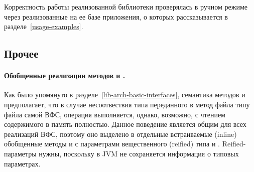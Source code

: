   Корректность работы реализованной библиотеки проверялась в ручном режиме через реализованные на ее базе приложения, о которых рассказывается в разделе~\ref{usage-examples}.

\subsection{Прочее}
  \paragraph{Обобщенные реализации методов  и .} Как было упомянуто в разделе~\ref{lib-arch-basic-interfaces}, семантика методов  и  предполагает, что в случае несоотвествия типа переданного в метод файла типу файла самой ВФС, операция выполняется, однако, возможно, с чтением содержимого в память полностью. Данное поведение является общим для всех реализаций ВФС, поэтому оно выделено в отдельные встраиваемые (inline) обобщенные методы  и  с параметрами вещественного (reified) типа\cite{kotlin-reified}  и . Reified-параметры нужны, поскольку в JVM не сохраняется информация о типовых параметрах.


